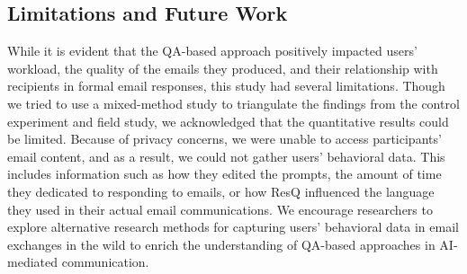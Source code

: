 \subsection{Limitations and Future Work}
While it is evident that the QA-based approach positively impacted users' workload, the quality of the emails they produced, and their relationship with recipients in formal email responses, this study had several limitations.
Though we tried to use a mixed-method study to triangulate the findings from the control experiment and field study, we acknowledged that the quantitative results could be limited.
Because of privacy concerns, we were unable to access participants' email content, and as a result, we could not gather users' behavioral data. 
This includes information such as how they edited the prompts, the amount of time they dedicated to responding to emails, or how ResQ influenced the language they used in their actual email communications.
We encourage researchers to explore alternative research methods for capturing users' behavioral data in email exchanges in the wild to enrich the understanding of QA-based approaches in AI-mediated communication.


